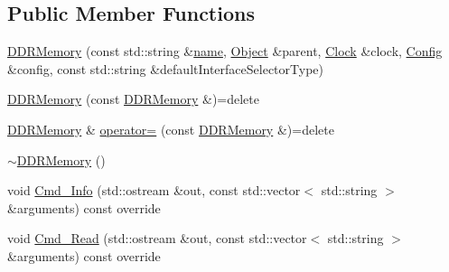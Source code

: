 \subsection*{Public Member Functions}
\begin{DoxyCompactItemize}
\item 
\hyperlink{class_simulator_1_1_d_d_r_memory_a6bd2272ef3ac2cfefff817b1191afd95}{D\+D\+R\+Memory} (const std\+::string \&\hyperlink{mtconf_8c_a8f8f80d37794cde9472343e4487ba3eb}{name}, \hyperlink{class_simulator_1_1_object}{Object} \&parent, \hyperlink{class_simulator_1_1_clock}{Clock} \&clock, \hyperlink{class_config}{Config} \&config, const std\+::string \&default\+Interface\+Selector\+Type)
\item 
\hyperlink{class_simulator_1_1_d_d_r_memory_a47faba8d51f4e69ef2a61f7e15f4aec3}{D\+D\+R\+Memory} (const \hyperlink{class_simulator_1_1_d_d_r_memory}{D\+D\+R\+Memory} \&)=delete
\item 
\hyperlink{class_simulator_1_1_d_d_r_memory}{D\+D\+R\+Memory} \& \hyperlink{class_simulator_1_1_d_d_r_memory_a15ca970994811f051136024c5dae06f5}{operator=} (const \hyperlink{class_simulator_1_1_d_d_r_memory}{D\+D\+R\+Memory} \&)=delete
\item 
\hyperlink{class_simulator_1_1_d_d_r_memory_ac0961064e1ac06702b4f4bc697c1f2cc}{$\sim$\+D\+D\+R\+Memory} ()
\item 
void \hyperlink{class_simulator_1_1_d_d_r_memory_a4bc97a978759100161dfd4055280e668}{Cmd\+\_\+\+Info} (std\+::ostream \&out, const std\+::vector$<$ std\+::string $>$ \&arguments) const override
\item 
void \hyperlink{class_simulator_1_1_d_d_r_memory_a76310d4d307fe95f326398a537a26e31}{Cmd\+\_\+\+Read} (std\+::ostream \&out, const std\+::vector$<$ std\+::string $>$ \&arguments) const override
\end{DoxyCompactItemize}
